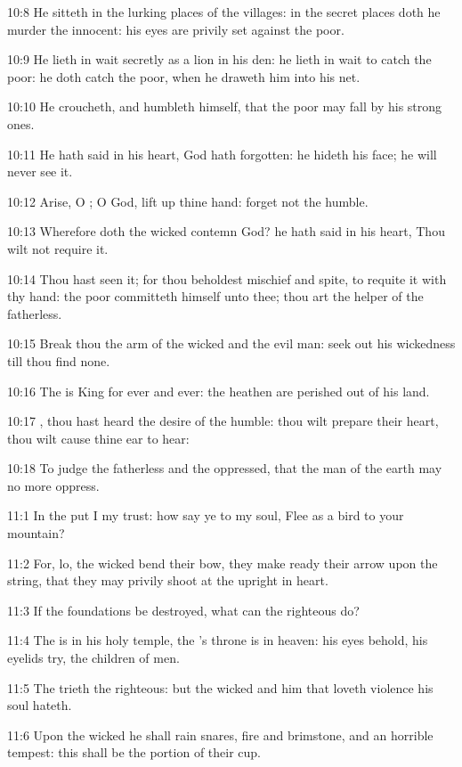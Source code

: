 10:8 He sitteth in the lurking places of the villages: in the secret places doth he murder the innocent: his eyes are privily set against the poor.

10:9 He lieth in wait secretly as a lion in his den: he lieth in wait to catch the poor: he doth catch the poor, when he draweth him into his net.

10:10 He croucheth, and humbleth himself, that the poor may fall by his strong ones.

10:11 He hath said in his heart, God hath forgotten: he hideth his face; he will never see it.

10:12 Arise, O \LORD; O God, lift up thine hand: forget not the humble.

10:13 Wherefore doth the wicked contemn God? he hath said in his heart, Thou wilt not require it.

10:14 Thou hast seen it; for thou beholdest mischief and spite, to requite it with thy hand: the poor committeth himself unto thee; thou art the helper of the fatherless.

10:15 Break thou the arm of the wicked and the evil man: seek out his wickedness till thou find none.

10:16 The \LORD is King for ever and ever: the heathen are perished out of his land.

10:17 \LORD, thou hast heard the desire of the humble: thou wilt prepare their heart, thou wilt cause thine ear to hear:

10:18 To judge the fatherless and the oppressed, that the man of the earth may no more oppress.



11:1 In the \LORD put I my trust: how say ye to my soul, Flee as a bird to your mountain?

11:2 For, lo, the wicked bend their bow, they make ready their arrow upon the string, that they may privily shoot at the upright in heart.

11:3 If the foundations be destroyed, what can the righteous do?

11:4 The \LORD is in his holy temple, the \LORD's throne is in heaven: his eyes behold, his eyelids try, the children of men.

11:5 The \LORD trieth the righteous: but the wicked and him that loveth violence his soul hateth.

11:6 Upon the wicked he shall rain snares, fire and brimstone, and an horrible tempest: this shall be the portion of their cup.

